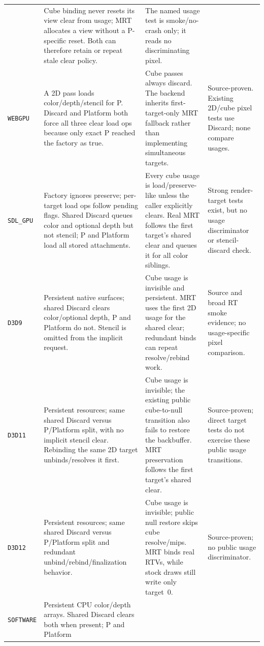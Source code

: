 \begin{longtable}{@{}p{}p{}p{}p{}@{}}
  & Cube binding never resets its view clear from usage; MRT allocates a view without a
    P-specific reset. Both can therefore retain or repeat stale clear policy.
  & The named usage test is smoke/no-crash only; it reads no discriminating pixel. \\
\texttt{WEBGPU}
  & A 2D pass loads color/depth/stencil for P. Discard and Platform both force all three clear
    load ops because only exact P reached the factory as true.
  & Cube passes always discard. The backend inherits first-target-only MRT fallback rather
    than implementing simultaneous targets.
  & Source-proven. Existing 2D/cube pixel tests use Discard; none compare usages. \\
\texttt{SDL\_GPU}
  & Factory ignores preserve; per-target load ops follow pending flags. Shared Discard queues
    color and optional depth but not stencil; P and Platform load all stored attachments.
  & Every cube usage is load/preserve-like unless the caller explicitly clears. Real MRT
    follows the first target's shared clear and queues it for all color siblings.
  & Strong render-target tests exist, but no usage discriminator or stencil-discard check. \\
\texttt{D3D9}
  & Persistent native surfaces; shared Discard clears color/optional depth, P and Platform do
    not. Stencil is omitted from the implicit request.
  & Cube usage is invisible and persistent. MRT uses the first 2D usage for the shared clear;
    redundant binds can repeat resolve/rebind work.
  & Source and broad RT smoke evidence; no usage-specific pixel comparison. \\
\texttt{D3D11}
  & Persistent resources; same shared Discard versus P/Platform split, with no implicit
    stencil clear. Rebinding the same 2D target unbinds/resolves it first.
  & Cube usage is invisible; the existing public cube-to-null transition also fails to restore
    the backbuffer. MRT preservation follows the first target's shared clear.
  & Source-proven; direct target tests do not exercise these public usage transitions. \\
\texttt{D3D12}
  & Persistent resources; same shared Discard versus P/Platform split and redundant
    unbind/rebind/finalization behavior.
  & Cube usage is invisible; public null restore skips cube resolve/mips. MRT binds real RTVs,
    while stock draws still write only target~0.
  & Source-proven; no public usage discriminator. \\
\texttt{SOFTWARE}
  & Persistent CPU color/depth arrays. Shared Discard clears both when present; P and Platform

\end{longtable}
